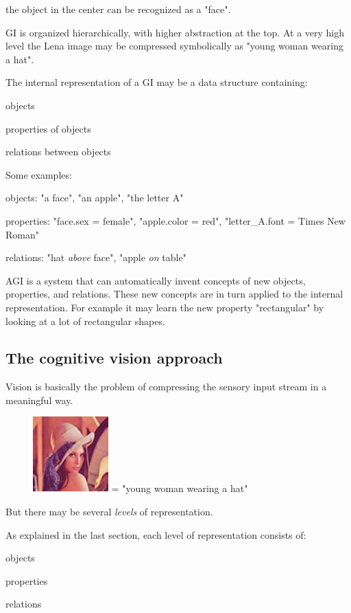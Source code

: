 the object in the center can be recognized as a "face".

GI is organized hierarchically, with higher abstraction at the top. At a very high level the Lena image may be compressed symbolically as "young woman wearing a hat".

The internal representation of a GI may be a data structure containing:
\begin{compactenum}
	\item objects
	\item properties of objects
	\item relations between objects
\end{compactenum}

Some examples:
\begin{compactenum}
	\item objects: "a face", "an apple", "the letter A"
	\item properties: "face.sex = female", "apple.color = red", "letter\_A.font = Times New Roman"
	\item relations: "hat \emph{above} face", "apple \emph{on} table"
\end{compactenum}

AGI is a system that can automatically invent concepts of new objects, properties, and relations. These new concepts are in turn applied to the internal representation. For example it may learn the new property "rectangular" by looking at a lot of rectangular shapes.

\subsection{The cognitive vision approach}

Vision is basically the problem of compressing the sensory input stream in a meaningful way.

\begin{figure}[H]
\centering
\includegraphics[scale=0.7]{Lena-Tiny.png} = "young woman wearing a hat"
\end{figure}

But there may be several \emph{levels} of representation.

As explained in the last section, each level of representation consists of:
\begin{compactenum}
	\item objects
	\item properties
	\item relations
\end{compactenum}

